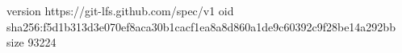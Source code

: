 version https://git-lfs.github.com/spec/v1
oid sha256:f5d1b313d3e070ef8aca30b1cacf1ea8a8d860a1de9c60392c9f28be14a292bb
size 93224
